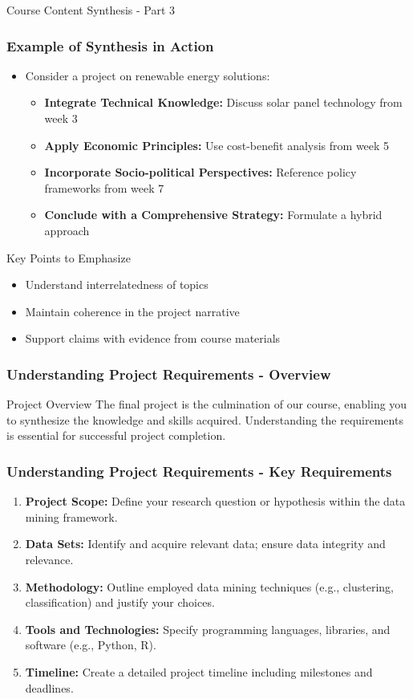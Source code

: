\documentclass[aspectratio=169]{beamer}
\begin{document}
\begin{frame}[fragile]{Course Content Synthesis - Part 3}
  \frametitle{Example of Synthesis in Action}
  \begin{itemize}
    \item Consider a project on renewable energy solutions:
      \begin{itemize}
        \item \textbf{Integrate Technical Knowledge:} Discuss solar panel technology from week 3
        \item \textbf{Apply Economic Principles:} Use cost-benefit analysis from week 5
        \item \textbf{Incorporate Socio-political Perspectives:} Reference policy frameworks from week 7
        \item \textbf{Conclude with a Comprehensive Strategy:} Formulate a hybrid approach
      \end{itemize}
  \end{itemize}
  \begin{block}{Key Points to Emphasize}
    \begin{itemize}
      \item Understand interrelatedness of topics
      \item Maintain coherence in the project narrative
      \item Support claims with evidence from course materials
    \end{itemize}
  \end{block}
\end{frame}

\begin{frame}[fragile]
    \frametitle{Understanding Project Requirements - Overview}
    \begin{block}{Project Overview}
        The final project is the culmination of our course, enabling you to synthesize the knowledge and skills acquired. 
        Understanding the requirements is essential for successful project completion.
    \end{block}
\end{frame}

\begin{frame}[fragile]
    \frametitle{Understanding Project Requirements - Key Requirements}
    \begin{enumerate}
        \item \textbf{Project Scope:} Define your research question or hypothesis within the data mining framework.
        \item \textbf{Data Sets:} Identify and acquire relevant data; ensure data integrity and relevance.
        \item \textbf{Methodology:} Outline employed data mining techniques (e.g., clustering, classification) and justify your choices.
        \item \textbf{Tools and Technologies:} Specify programming languages, libraries, and software (e.g., Python, R).
        \item \textbf{Timeline:} Create a detailed project timeline including milestones and deadlines.
    \end{enumerate}
\end{frame}
\end{document}
